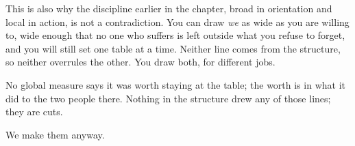 This is also why the discipline earlier in the chapter, broad in orientation and local in action, is not a contradiction. You can draw \emph{we} as wide as you are willing to, wide enough that no one who suffers is left outside what you refuse to forget, and you will still set one table at a time. Neither line comes from the structure, so neither overrules the other. You draw both, for different jobs.

No global measure says it was worth staying at the table; the worth is in what it did to the two people there. Nothing in the structure drew any of those lines; they are cuts.

We make them anyway.
